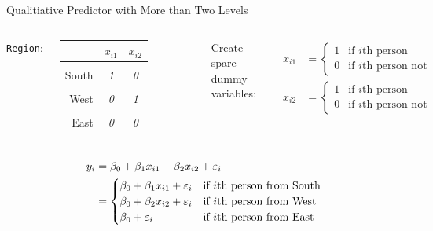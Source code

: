 \documentclass[aspectratio=169,usenames,dvipsnames]{beamer}
\newcommand{\InstructorNotes}[1]{\textit{\color{orange}#1}}
\begin{document}
\begin{frame}[c]{Qualitiative Predictor with More than Two Levels}

\begin{columns}
\centering
\texttt{Region}:

\qquad

\begin{tabular}{r|cc}
	 & $x_{i1}$ & $x_{i2}$ \\ \hline
	 & \\
	South & \InstructorNotes{1 } & \InstructorNotes{0} \\
	\\
	West & \InstructorNotes{0 } & \InstructorNotes{1}\\
	\\
	East& \InstructorNotes{0 } & \InstructorNotes{0}\\
	&
\end{tabular}


\centering
Create spare dummy variables:

\begin{align*}
		x_{i1} &=
	\begin{cases}
		1 & \text{if $i$th person from South}\\
		0 & \text{if $i$th person not from South}
	\end{cases}\\
%
		x_{i2} &=
	\begin{cases}
		1 & \text{if $i$th person from West}\\
		0 & \text{if $i$th person not from West}
	\end{cases}
\end{align*}

\end{columns}


\begin{align*}
y_i &= \beta_0 + \beta_1x_{i1}+ \beta_2x_{i2}+\varepsilon_i\\
&=
	\begin{cases}
		\beta_0 + \beta_1x_{i1}+\varepsilon_i & \text{if $i$th person from South}\\
		\beta_0 +  \beta_2x_{i2}+\varepsilon_i& \text{if $i$th person from West}\\
		\beta_0 + \varepsilon_i & \text{if $i$th person from East}
	\end{cases}
\end{align*}

\end{frame}
\end{document}
